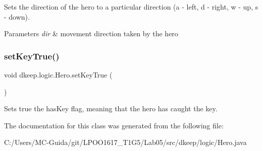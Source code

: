 Sets the direction of the hero to a particular direction (a -\/ left, d -\/ right, w -\/ up, s -\/ down). 
\begin{DoxyParams}{Parameters}
{\em dir} & movement direction taken by the hero \\
\hline
\end{DoxyParams}
\mbox{\label{classdkeep_1_1logic_1_1_hero_a72b13a616bd52ce76b73e6e5e96ccf72}} 
\subsubsection{\texorpdfstring{set\+Key\+True()}{setKeyTrue()}}
{\footnotesize\ttfamily void dkeep.\+logic.\+Hero.\+set\+Key\+True (\begin{DoxyParamCaption}{ }\end{DoxyParamCaption})}

Sets true the has\+Key flag, meaning that the hero has caught the key. 

The documentation for this class was generated from the following file\+:\begin{DoxyCompactItemize}
\item 
C\+:/\+Users/\+M\+C-\/\+Guida/git/\+L\+P\+O\+O1617\+\_\+\+T1\+G5/\+Lab05/src/dkeep/logic/Hero.\+java\end{DoxyCompactItemize}
